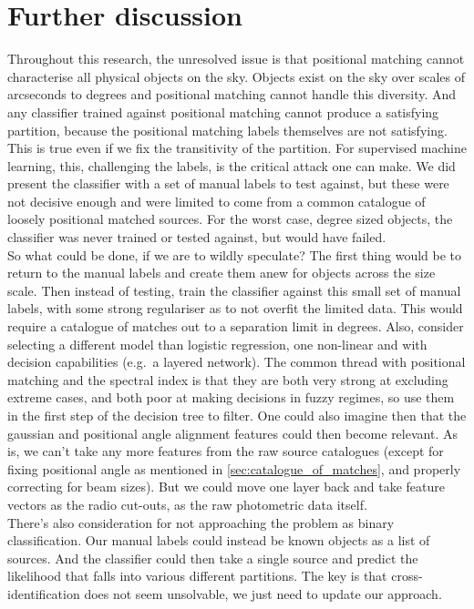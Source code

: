 \documentclass[12pt,a4paper]{article}
\begin{document}
\section{Further discussion}
\label{sec:discussion}
Throughout this research, the unresolved issue is that positional matching cannot characterise all physical objects on the sky. Objects exist on the sky over scales of arcseconds to degrees and positional matching cannot handle this diversity. And any classifier trained against positional matching cannot produce a satisfying partition, because the positional matching labels themselves are not satisfying. This is true even if we fix the transitivity of the partition. For supervised machine learning, this, challenging the labels, is the critical attack one can make. We did present the classifier with a set of manual labels to test against, but these were not decisive enough and were limited to come from a common catalogue of loosely positional matched sources. For the worst case, degree sized objects, the classifier was never trained or tested against, but would have failed.\\

So what could be done, if we are to wildly speculate? The first thing would be to return to the manual labels and create them anew for objects across the size scale. Then instead of testing, train the classifier against this small set of manual labels, with some strong regulariser as to not overfit the limited data. This would require a catalogue of matches out to a separation limit in degrees. Also, consider selecting a different model than logistic regression, one non-linear and with decision capabilities (e.g.\ a layered network). The common thread with positional matching and the spectral index is that they are both very strong at excluding extreme cases, and both poor at making decisions in fuzzy regimes, so use them in the first step of the decision tree to filter. One could also imagine then that the gaussian and positional angle alignment features could then become relevant. As is, we can't take any more features from the raw source catalogues (except for fixing positional angle as mentioned in \ref{sec:catalogue_of_matches}, and properly correcting for beam sizes). But we could move one layer back and take feature vectors as the radio cut-outs, as the raw photometric data itself.\\

There's also consideration for not approaching the problem as binary classification. Our manual labels could instead be known objects as a list of sources. And the classifier could then take a single source and predict the likelihood that falls into various different partitions. The key is that cross-identification does not seem unsolvable, we just need to update our approach.
\end{document}
